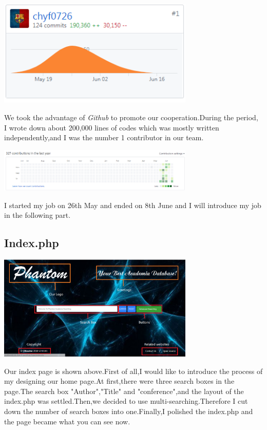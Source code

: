 \documentclass[10pt,twoside,a4paper,titlepage]{article}
\begin{document}
	\includegraphics[width=0.7\textwidth]{cyf/contribution.PNG}
	
	We took the advantage of \emph{Github} to promote our cooperation.During the period, I wrote down about 200,000 lines of codes which was mostly written independently,and I was the number 1 contributor in our team.
	
	\includegraphics[width=0.7\textwidth]{cyf/frequency.PNG}
	
	I started my job on 26th May and ended on 8th June and I will introduce my job in the following part.
	
	
	\subsection{Index.php}
	
	\includegraphics[width=0.7\textwidth]{cyf/index_structure.PNG}
	
	Our index page is shown above.First of all,I would like to introduce the process of my designing our home page.At first,there were three search boxes in the page.The search box "Author","Title" and "conference",and the layout of the index.php was settled.Then,we decided to use multi-searching.Therefore I cut down the number of search boxes into one.Finally,I polished the index.php and the page became what you can see now.
	
\end{document}
